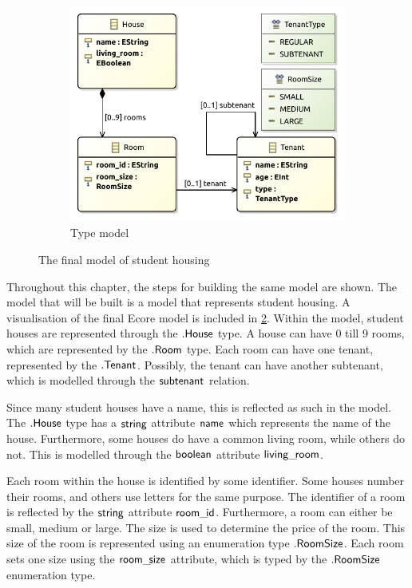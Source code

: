 \begin{figure}[p]
\begin{subfigure}{0.98\textwidth}
        \includegraphics{images/06_application/type_model/step15.pdf}
        \caption{Type model}
        \label{fig:application:the_model:final_ecore_model:type_model}
    \end{subfigure}
    \caption{The final model of student housing}
    \label{fig:application:the_model:final_ecore_model}
\end{figure}

Throughout this chapter, the steps for building the same model are shown. The model that will be built is a model that represents student housing. A visualisation of the final Ecore model is included in \cref{fig:application:the_model:final_ecore_model}. Within the model, student houses are represented through the $.\mathsf{House}$ type. A house can have 0 till 9 rooms, which are represented by the $.\mathsf{Room}$ type. Each room can have one tenant, represented by the $.\mathsf{Tenant}$. Possibly, the tenant can have another subtenant, which is modelled through the $\mathsf{subtenant}$ relation.

Since many student houses have a name, this is reflected as such in the model. The $.\mathsf{House}$ type has a $\mathsf{string}$ attribute $\mathsf{name}$ which represents the name of the house. Furthermore, some houses do have a common living room, while others do not. This is modelled through the $\mathsf{boolean}$ attribute $\mathsf{living\_\!room}$.

Each room within the house is identified by some identifier. Some houses number their rooms, and others use letters for the same purpose. The identifier of a room is reflected by the $\mathsf{string}$ attribute $\mathsf{room\_\!id}$. Furthermore, a room can either be small, medium or large. The size is used to determine the price of the room. This size of the room is represented using an enumeration type $.\mathsf{RoomSize}$. Each room sets one size using the $\mathsf{room\_\!size}$ attribute, which is typed by the $.\mathsf{RoomSize}$ enumeration type.

